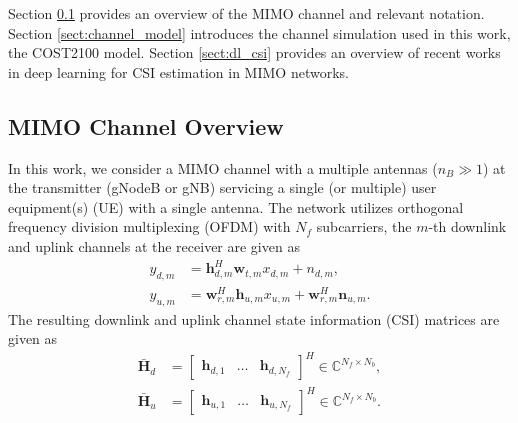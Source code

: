
Section \ref{sect:mimo_model} provides an overview of the MIMO channel and relevant notation. Section \ref{sect:channel_model} introduces the channel simulation used in this work, the COST2100 model. Section \ref{sect:dl_csi} provides an overview of recent works in deep learning for CSI estimation in MIMO networks. 

\subsection{MIMO Channel Overview}
\label{sect:mimo_model}

In this work, we consider a MIMO channel with a multiple antennas ($n_B \gg 1$) at the transmitter (gNodeB or gNB) servicing a single (or multiple) user equipment(s) (UE) with a single antenna. The network utilizes orthogonal frequency division multiplexing (OFDM) with $N_f$ subcarriers, the $m$-th downlink and uplink channels at the receiver are given as
\begin{align*}
	y_{d,m} &= \mathbf h_{d,m}^H\mathbf w_{t,m}x_{d,m} + n_{d,m}, \\
	y_{u,m} &= \mathbf w_{r,m}^H\mathbf h_{u,m}x_{u,m} + \mathbf w_{r,m}^H\mathbf n_{u,m}.
\end{align*}
The resulting downlink and uplink channel state information (CSI) matrices are given as
\begin{align*} 
	\bar{\mathbf H}_d &= \begin{bmatrix} \mathbf h_{d,1} & \dots & \mathbf h_{d,N_f}\end{bmatrix}^H \in \mathbb C^{N_f \times N_b}, \\
	\bar{\mathbf H}_u &= \begin{bmatrix} \mathbf h_{u,1} & \dots & \mathbf h_{u,N_f}\end{bmatrix}^H \in \mathbb C^{N_f \times N_b}.
\end{align*}
